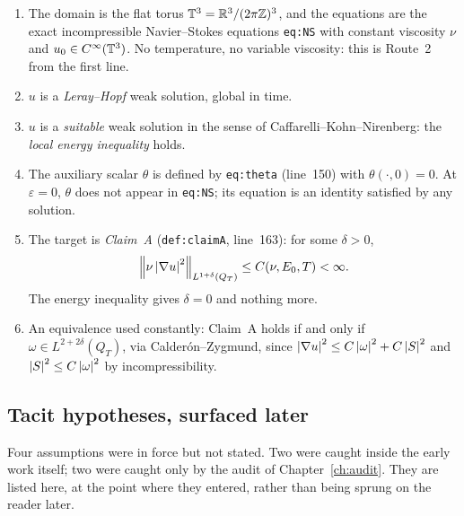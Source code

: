 \begin{enumerate}[leftmargin=2.2em]
\item The domain is the flat torus \(\mathbb{T}^3=\mathbb{R}^3/(2\pi\mathbb{Z})^3\), and the equations
  are the exact incompressible Navier--Stokes equations \texttt{eq:NS} with
  constant viscosity \(\nu\) and \(u_0\in C^\infty(\mathbb{T}^3)\). No temperature, no
  variable viscosity: this is Route~2 from the first line.
\item \(u\) is a \emph{Leray--Hopf} weak solution, global in time.
\item \(u\) is a \emph{suitable} weak solution in the sense of
  Caffarelli--Kohn--Nirenberg: the \emph{local energy inequality} holds.
\item The auxiliary scalar \(\theta\) is defined by \texttt{eq:theta}
  (line~150) with \(\theta(\cdot,0)=0\). At \(\varepsilon=0\), \(\theta\) does
  not appear in \texttt{eq:NS}; its equation is an identity satisfied by any
  solution.
\item The target is \emph{Claim~A} (\texttt{def:claimA}, line~163): for some
  \(\delta>0\),
  \[
    \left\|\nu\left|\nabla u\right|^2\right\|_{L^{1+\delta}(Q_T)} \le C(\nu,E_0,T)<\infty .
  \]
  The energy inequality gives \(\delta=0\) and nothing more.
\item An equivalence used constantly: Claim~A holds if and only if
  \(\omega\in L^{2+2\delta}(Q_T)\), via Calder\'on--Zygmund, since
  \(\left|\nabla u\right|^2\le C\left|\omega\right|^2+C\left|S\right|^2\) and
  \(\left|S\right|^2\le C\left|\omega\right|^2\) by incompressibility.
\end{enumerate}

\subsection{Tacit hypotheses, surfaced later}

Four assumptions were in force but not stated. Two were caught inside the
early work itself; two were caught only by the audit of
Chapter~\ref{ch:audit}. They are listed here, at the point where they entered,
rather than being sprung on the reader later.

